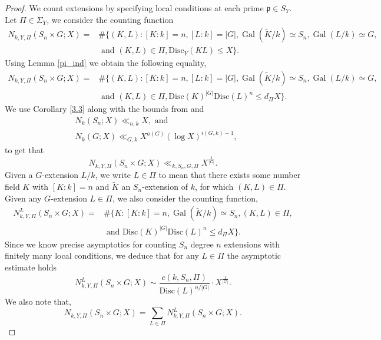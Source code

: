 \documentclass[11pt]{amsart}
\newcommand{\fp}{\mathfrak{p}}
\newcommand{\disc}{\mathrm{Disc}}
\newcommand{\op}[1]{\operatorname{#1}}
\numberwithin{equation}{section}
\begin{document}
\begin{proof}
    We count extensions by specifying local conditions at each prime $\fp \in S_Y$. Let $\Pi \in \Sigma_Y$, we consider the counting function
    \begin{align*}
        N_{k,Y,\Pi}(S_n\times G; X) =& \#\{(K,L): [K:k]= n, [L:k] = |G|, \op{Gal}(\widetilde{K}/k) \simeq S_n, \op{Gal}(L/k) \simeq G,\\
         & \text{ and }(K,L) \in \Pi, \disc_Y(KL) \leq X \}.
    \end{align*}
    Using Lemma \ref{pi_ind} we obtain the following equality,
    \begin{align*}
        N_{k,Y,\Pi}(S_n\times G; X) = &\#\{(K,L): [K:k]= n, [L:k] = |G|, \op{Gal}(\widetilde{K}/k) \simeq S_n, \op{Gal}(L/k) \simeq G,\\
         & \text{ and }(K,L) \in \Pi, \disc(K)^{|G|}\disc(L)^n \leq d_{\Pi}X \}.
    \end{align*}
    We use Corollary \ref{3.3} along with the bounds from \cite{bhargava2015geometryofnumbers} and \cite{koymanspagano2023}
    \begin{equation}\label{prev bounds}
    \begin{split}
    & N_k(S_n; X)\ll_{n, k} X, \text{ and } \\
    & N_k(G; X) \ll_{G, k} X^{a(G)}(\log X)^{i(G,k)-1},
\end{split}
\end{equation} to get that
    \[
    N_{k,Y,\Pi}(S_n\times G; X) \ll_{k,S_n,G,\Pi} X^{\frac{1}{|G|}}.
    \]
    Given a $G$-extension $L/k$, we write $L\in \Pi$ to mean that there exists some number field $K$ with $[K:k]=n$ and $\widetilde{K}$ an $S_n$-extension of $k$, for which $(K, L)\in \Pi$. Given any $G$-extension $L \in \Pi$, we also consider the counting function,
    \begin{align*}
        N_{k,Y,\Pi}^L(S_n\times G; X) = &\#\{K: [K:k]= n, \op{Gal}(\widetilde{K}/k) \simeq S_n, (K,L) \in \Pi,\\
        & \text{ and } \disc(K)^{|G|}\disc(L)^n \leq d_{\Pi}X \}.
    \end{align*}
    Since we know precise asymptotics for counting $S_n$ degree $n$ extensions \cite{bhargava2015geometryofnumbers} with finitely many local conditions, we deduce that for any $L \in \Pi$ the asymptotic estimate holds
    \[
    N_{k,Y,\Pi}^L(S_n\times G; X) \sim \frac{c(k, S_n, \Pi)}{\disc(L)^{n/|G|}}\cdot X^{\frac{1}{|G|}}.
    \]
    We also note that,
    \[
    N_{k,Y,\Pi}(S_n\times G; X) = \sum_{L \in \Pi} N_{k,Y,\Pi}^L(S_n\times G; X).
\]
\end{proof}
\end{document}
